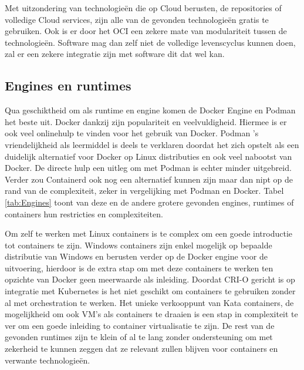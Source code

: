 Met uitzondering van technologieën die op Cloud berusten, de repositories of volledige Cloud services, zijn alle van de gevonden technologieën gratis te gebruiken. Ook is er door het OCI een zekere mate van modulariteit tussen de technologieën. Software mag dan zelf niet de volledige levenscyclus kunnen doen, zal er een zekere integratie zijn met software dit dat wel kan.

\subsection{Engines en runtimes}
Qua geschiktheid om als runtime en engine komen de Docker Engine en Podman het beste uit. Docker dankzij zijn populariteit en veelvuldigheid. Hiermee is er ook veel onlinehulp te vinden voor het gebruik van Docker. Podman ’s vriendelijkheid als leermiddel is deels te verklaren doordat het zich opstelt als een duidelijk alternatief voor Docker op Linux distributies en ook veel nabootst van Docker. De directe hulp een uitleg om met Podman is echter minder uitgebreid.  Verder zou Containerd ook nog een alternatief kunnen zijn maar dan nipt op de rand van de complexiteit, zeker in vergelijking met Podman en Docker. Tabel \ref{tab:Engines} toont van deze en de andere grotere gevonden engines, runtimes of containers hun restricties en complexiteiten. 

Om zelf te werken met Linux containers is te complex om een goede introductie tot containers te zijn. Windows containers zijn enkel mogelijk op bepaalde distributie van Windows en berusten verder op de Docker engine voor de uitvoering, hierdoor is de extra stap om met deze containers te werken ten opzichte van Docker geen meerwaarde als inleiding. Doordat CRI-O gericht is op integratie met Kubernetes is het niet geschikt om containers te gebruiken zonder al met orchestration te werken.  Het unieke verkooppunt van Kata containers, de mogelijkheid om ook VM’s als containers te draaien is een stap in complexiteit te ver om een goede inleiding to container virtualisatie te zijn.  De rest van de gevonden runtimes zijn te klein of al te lang zonder ondersteuning om met zekerheid te kunnen zeggen dat ze relevant zullen blijven voor containers en verwante technologieën. 



